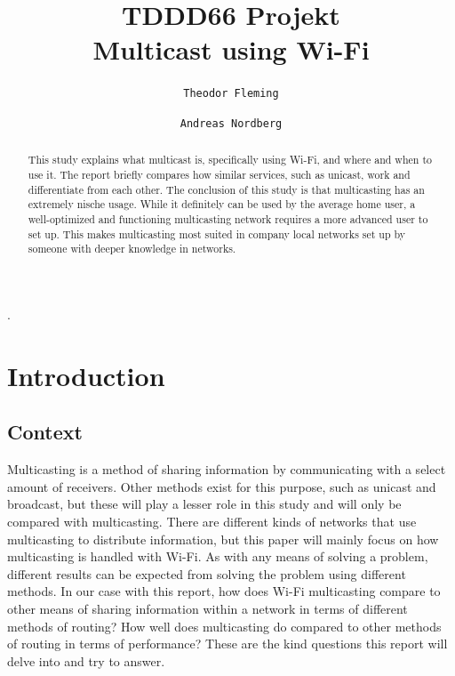 \documentclass[9pt,a4paper]{acmproc}
\author{
  \texttt{Theodor Fleming}
  \and
  \texttt{Andreas Nordberg}
}
\begin{document}

\title{%
	TDDD66 Projekt \\
	\large Multicast using Wi-Fi}
\maketitle

\clearpage
.
\clearpage

\begin{abstract}

This study explains what multicast is, specifically using Wi-Fi, and where and when to use it. The report briefly compares how similar services, such as unicast, work and differentiate from each other. The conclusion of this study is that multicasting has an extremely nische usage. While it definitely can be used by the average home user, a well-optimized and functioning multicasting network requires a more advanced user to set up. This makes multicasting most suited in company local networks set up by someone with deeper knowledge in networks.
\end{abstract}

\clearpage

\section{Introduction}

\subsection{Context}

Multicasting is a method of sharing information by communicating with a select amount of receivers. Other methods exist for this purpose, such as unicast and broadcast, but these will play a lesser role in this study and will only be compared with multicasting. There are different kinds of networks that use multicasting to distribute information, but this paper will mainly focus on how multicasting is handled with Wi-Fi. As with any means of solving a problem, different results can be expected from solving the problem using different methods. In our case with this report, how does Wi-Fi multicasting compare to other means of sharing information within a network in terms of different methods of routing? How well does multicasting do compared to other methods of routing in terms of performance? These are the kind questions this report will delve into and try to answer.  
\end{document}
